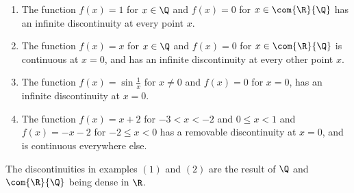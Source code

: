\begin{example}
    \begin{enumerate}[label=(\arabic*)]
        \item The function $f(x)=1$ for  $x \in \Q$ and  $f(x)=0$ for  $x \in \com{\R}{\Q}$ has 
            an infinite discontinuity at every point $x$.

        \item The function $f(x)=x$ for  $x \in \Q$ and  $f(x)=0$ for  
            $x \in \com{\R}{\Q}$ is continuous at $x=0$, and has an infinite 
            discontinuity at every other point $x$.

        \item The function $f(x)=\sin{\frac{1}{x}}$ for  $x \neq 0$ and  $f(x)=0$ for $x=0$, 
            has an infinite discontinuity at $x=0$.

        \item The function $f(x)=x+2$ for  $-3<x<-2$ and  $0 \leq x<1$ and  $f(x)=-x-2$ for 
            $-2 \leq x<0$ has a removable discontinuity at  $x=0$, and is continuous everywhere 
            else.
    \end{enumerate}		
\end{example} 

\begin{remark} 
    The discontinuities in examples $(1)$ and  $(2)$ are the result of  $\Q$ and  
    $\com{\R}{\Q}$ being dense in  $\R$.
\end{remark}
